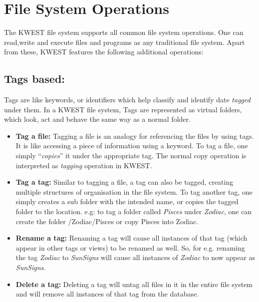 \section{File System Operations}
The KWEST file system supports all common file system operations. One can read,write and execute files and programs as any traditional file system. Apart from these, KWEST features the following additional operations:

\subsection{Tags based:}
Tags are like keywords, or identifiers which help classify and identify date \textit{tagged} under them. 
In a KWEST file system, Tags are represented as virtual folders, which look, act and behave the same way as a normal folder.
\begin{itemize} 
\item \textbf{Tag a file:} \newline
Tagging a file is an analogy for referencing the files by using tags. It is like accessing a piece of information using a keyword.
To tag a file, one simply ``\textit{copies}'' it under the appropriate tag. The normal copy operation is interpreted as \textit{tagging} operation in KWEST.
\item \textbf{Tag a tag:} \newline
Similar to tagging a file, a tag can also be tagged, creating multiple structures of organisation in the file system. To tag another tag, one simply creates a sub folder with the intended name, or copies the tagged folder to the location. \newline
e.g: to tag a folder called \textit{Pisces} under \textit{Zodiac}, one can create the folder /Zodiac/Pisces or copy Pisces into Zodiac.
\item \textbf{Rename a tag:} \newline
Renaming a tag will cause all instances of that tag  (which appear in other tags or views) to be renamed as well. So, for e.g. renaming the tag \textit{Zodiac} to \textit{SunSigns} will cause all instances of \textit{Zodiac} to now appear as \textit{SunSigns}.
\item \textbf{Delete a tag:} \newline
Deleting a tag will untag all files in it in the entire file system and will remove all instances of that tag from the database. 
\end{itemize}

